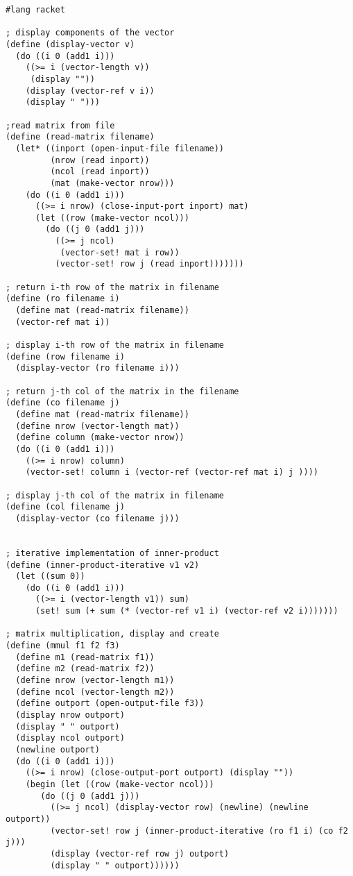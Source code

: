 \documentclass{article}
\begin{document}
\begin{verbatim}
#lang racket

; display components of the vector
(define (display-vector v)
  (do ((i 0 (add1 i)))
    ((>= i (vector-length v))
     (display ""))
    (display (vector-ref v i))
    (display " ")))

;read matrix from file
(define (read-matrix filename)
  (let* ((inport (open-input-file filename))
         (nrow (read inport))
         (ncol (read inport))
         (mat (make-vector nrow)))
    (do ((i 0 (add1 i)))
      ((>= i nrow) (close-input-port inport) mat)
      (let ((row (make-vector ncol)))
        (do ((j 0 (add1 j)))
          ((>= j ncol)
           (vector-set! mat i row))
          (vector-set! row j (read inport)))))))

; return i-th row of the matrix in filename
(define (ro filename i)
  (define mat (read-matrix filename))
  (vector-ref mat i))

; display i-th row of the matrix in filename
(define (row filename i)
  (display-vector (ro filename i)))

; return j-th col of the matrix in the filename
(define (co filename j)
  (define mat (read-matrix filename))
  (define nrow (vector-length mat))
  (define column (make-vector nrow))
  (do ((i 0 (add1 i)))
    ((>= i nrow) column)
    (vector-set! column i (vector-ref (vector-ref mat i) j ))))

; display j-th col of the matrix in filename
(define (col filename j)
  (display-vector (co filename j)))


; iterative implementation of inner-product
(define (inner-product-iterative v1 v2)
  (let ((sum 0))
    (do ((i 0 (add1 i)))
      ((>= i (vector-length v1)) sum)
      (set! sum (+ sum (* (vector-ref v1 i) (vector-ref v2 i)))))))

; matrix multiplication, display and create
(define (mmul f1 f2 f3)
  (define m1 (read-matrix f1))
  (define m2 (read-matrix f2))
  (define nrow (vector-length m1))
  (define ncol (vector-length m2))
  (define outport (open-output-file f3))
  (display nrow outport)
  (display " " outport)
  (display ncol outport)
  (newline outport)
  (do ((i 0 (add1 i)))
    ((>= i nrow) (close-output-port outport) (display ""))
    (begin (let ((row (make-vector ncol)))
       (do ((j 0 (add1 j)))
         ((>= j ncol) (display-vector row) (newline) (newline outport))
         (vector-set! row j (inner-product-iterative (ro f1 i) (co f2 j)))
         (display (vector-ref row j) outport)
         (display " " outport))))))
\end{verbatim}
\end{document}
